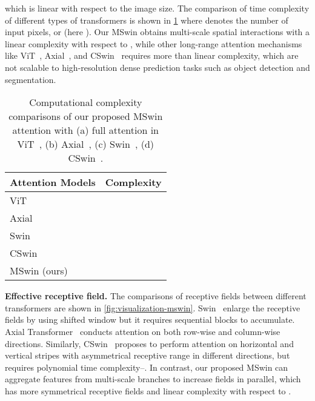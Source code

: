 \documentclass[runningheads]{llncs}
\begin{document}
which is linear with respect to the image size. The comparison of time complexity of different types of transformers is shown in \cref{tab:complexity-compare} where  denotes the number of input pixels, or  (here ). Our MSwin obtains multi-scale spatial interactions with a linear complexity with respect to , while other long-range attention mechanisms like ViT~\cite{dosovitskiy2020image}, Axial~\cite{wang2020axial}, and CSwin~\cite{dong2021cswin} requires more than linear complexity, which are not scalable to high-resolution dense prediction tasks such as object detection and segmentation.

\begin{table}[!ht]
\centering
\footnotesize
\def\xwidth{0.245}
\renewcommand\thetable{T1}
    \caption{Computational complexity comparisons of our proposed MSwin attention with (a) full attention in ViT~\cite{dosovitskiy2020image}, (b) Axial~\cite{wang2020axial}, (c) Swin~\cite{liu2021swin}, (d) CSwin~\cite{dong2021cswin}. }
    \label{tab:complexity-compare}
\setlength{\tabcolsep}{8pt}
    \begin{tabular}{l|c}
\cellcolor{lightgray}  Attention Models &  \cellcolor{lightgray}  Complexity  \\
 \toprule
ViT~\cite{dosovitskiy2020image} &  \\
Axial~\cite{wang2020axial} &  \\
Swin~\cite{liu2021swin} &   \\
CSwin~\cite{dong2021cswin} & \\
\hline
MSwin (ours) &   \\
\bottomrule
\end{tabular}
\vspace{-5mm}
\end{table}


\noindent\textbf{Effective receptive field. }The comparisons of receptive fields between different transformers are shown in \cref{fig:visualization-mswin}. Swin~\cite{liu2021swin} enlarge the receptive fields by using shifted window but it requires sequential blocks to accumulate. Axial Transformer~\cite{wang2020axial} conducts attention on both row-wise and column-wise directions. Similarly, CSwin~\cite{dong2021cswin} proposes to perform attention on horizontal and vertical stripes with asymmetrical receptive range in different directions, but requires polynomial time complexity--. In contrast, our proposed MSwin can aggregate features from multi-scale branches to increase fields in parallel, which has more symmetrical receptive fields and linear complexity with respect to .
\end{document}
